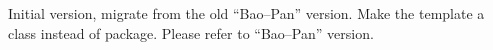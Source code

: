 {}\markdownRendererUlBegin
\markdownRendererUlItem Initial version, migrate from the old ``Bao--Pan'' version. Make the template a class instead of package.\markdownRendererUlItemEnd 
\markdownRendererUlEnd \markdownRendererInterblockSeparator
{}
\markdownRendererSectionEnd 
\markdownRendererSectionEnd \markdownRendererSectionBegin
{}\markdownRendererInterblockSeparator
{}\markdownRendererSectionBegin
{}\markdownRendererInterblockSeparator
{}\markdownRendererUlBegin
\markdownRendererUlItem Please refer to ``Bao--Pan'' version.\markdownRendererUlItemEnd 
\markdownRendererUlEnd 
\markdownRendererSectionEnd 
\markdownRendererSectionEnd 
\markdownRendererSectionEnd \markdownRendererDocumentEnd